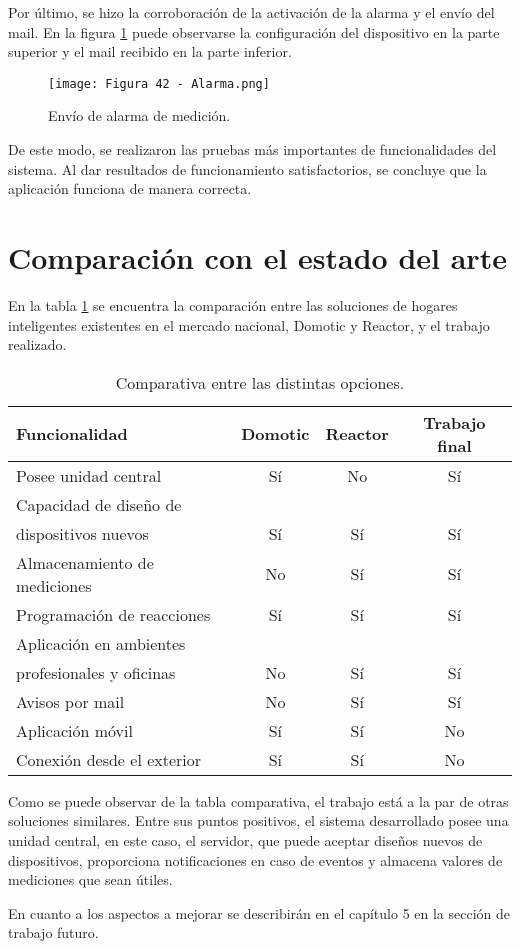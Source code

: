 Por último, se hizo la corroboración de la activación de la alarma y el envío del mail. En la figura \ref{fig:42} puede observarse la configuración del dispositivo en la parte superior y el mail recibido en la parte inferior.

\begin{figure}[h]
\centering
\texttt{[image: Figura 42 - Alarma.png]}
\caption[Envío de alarma de medición]{Envío de alarma de medición.}
\label{fig:42}
\end{figure}

De este modo, se realizaron las pruebas más importantes de funcionalidades del sistema. Al dar resultados de funcionamiento satisfactorios, se concluye que la aplicación funciona de manera correcta.

\section{Comparación con el estado del arte}

En la tabla \ref{tab:estadoarte} se encuentra la comparación entre las soluciones de hogares inteligentes existentes en el mercado nacional, Domotic y Reactor, y el trabajo realizado. 

\newpage
\begin{table}[h]
\centering
\caption[Comparativa entre las distintas opciones - Estado del arte]{Comparativa entre las distintas opciones.}
\begin{tabular}{l c c c}
\toprule
\textbf{Funcionalidad} & \textbf{Domotic} & \textbf{Reactor} & \textbf{Trabajo final}\\
\midrule
Posee unidad central			& Sí		& No		& Sí\\
Capacidad de diseño de		&		&		&\\
dispositivos nuevos			& Sí		& Sí		& Sí\\
Almacenamiento de mediciones	& No		& Sí		& Sí\\
Programación de reacciones	& Sí		& Sí		& Sí\\
Aplicación en ambientes		&		&		&\\
profesionales y oficinas		& No		& Sí		& Sí\\
Avisos por mail				& No		& Sí		& Sí\\
Aplicación móvil				& Sí		& Sí		& No\\
Conexión	 desde el exterior	& Sí		& Sí		& No\\
\bottomrule
\hline
\end{tabular}
\label{tab:estadoarte}
\end{table}

Como se puede observar de la tabla comparativa, el trabajo está a la par de otras soluciones similares. Entre sus puntos positivos, el sistema desarrollado posee una unidad central, en este caso, el servidor, que puede aceptar diseños nuevos de dispositivos, proporciona notificaciones en caso de eventos y almacena valores de mediciones que sean útiles.

En cuanto a los aspectos a mejorar se describirán en el capítulo 5 en la sección de trabajo futuro.